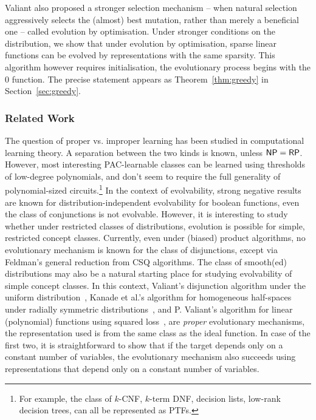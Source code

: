 Valiant also proposed a stronger selection mechanism -- when natural selection
aggressively selects the (almost) best mutation, rather than merely a beneficial
one -- called evolution by optimisation.  Under stronger conditions on the
distribution, we show that under evolution by optimisation, sparse linear
functions can be evolved by representations with the same sparsity. This
algorithm however requires initialisation, \ie the evolutionary process
begins with the $0$ function. The precise statement appears as
Theorem~\ref{thm:greedy} in Section~\ref{sec:greedy}.

\subsubsection*{Related Work}

The question of proper vs. improper learning has been studied in computational
learning theory. A separation between the two kinds is known, unless $\mathsf{NP} =
\mathsf{RP}$. However, most interesting PAC-learnable classes can be learned using
thresholds of low-degree polynomials, and don't seem to require the full
generality of polynomial-sized circuits.\footnote{For example, the class of
$k$-CNF, $k$-term DNF, decision lists, low-rank decision trees, can all be
represented as PTFs.} In the context of evolvability, strong negative results
are known for distribution-independent evolvability for boolean functions, \eg
even the class of conjunctions is not evolvable. However, it is interesting to
study whether under restricted classes of distributions, evolution is possible
for simple, restricted concept classes. Currently, even under (biased) product
algorithms, no evolutionary mechanism is known for the class of disjunctions,
except via Feldman's general reduction from CSQ algorithms. The class of
smooth(ed) distributions may also be a natural starting place for studying
evolvability of simple concept classes. In this context, Valiant's disjunction
algorithm under the uniform distribution~\cite{Valiant:2009-evolvability},
Kanade et al.'s algorithm for homogeneous half-spaces under radially symmetric
distributions~\cite{KVV:2010-drift}, and P. Valiant's algorithm for linear
(polynomial) functions using squared loss~\cite{Valiant:2012-real},
are \emph{proper} evolutionary mechanisms, \ie the
representation used is from the same class as the ideal function. In case of the
first two, it is straightforward to show that if the target depends only on a
constant number of variables, the evolutionary mechanism also succeeds using
representations that depend only on a constant number of variables.

